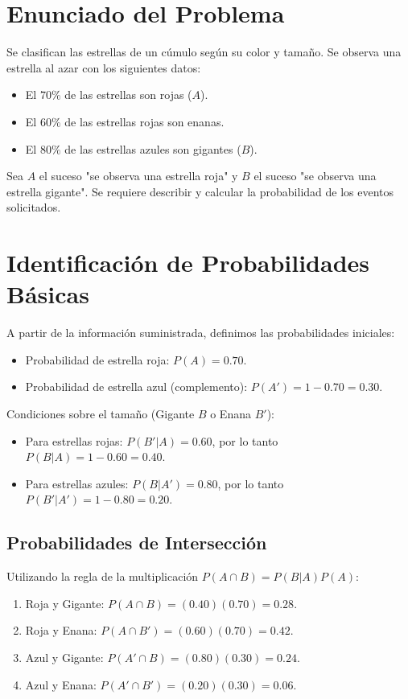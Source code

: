 \documentclass[12pt]{article}
\begin{document}
\section{Enunciado del Problema}
Se clasifican las estrellas de un cúmulo según su color y tamaño. Se observa una estrella al azar con los siguientes datos:
\begin{itemize}
    \item El $70\%$ de las estrellas son rojas ($A$).
    \item El $60\%$ de las estrellas rojas son enanas.
    \item El $80\%$ de las estrellas azules son gigantes ($B$).
\end{itemize}

Sea $A$ el suceso "se observa una estrella roja" y $B$ el suceso "se observa una estrella gigante". Se requiere describir y calcular la probabilidad de los eventos solicitados.

\section{Identificación de Probabilidades Básicas}
A partir de la información suministrada, definimos las probabilidades iniciales:
\begin{itemize}
    \item Probabilidad de estrella roja: $P(A) = 0.70$.
    \item Probabilidad de estrella azul (complemento): $P(A') = 1 - 0.70 = 0.30$.
\end{itemize}

Condiciones sobre el tamaño (Gigante $B$ o Enana $B'$):
\begin{itemize}
    \item Para estrellas rojas: $P(B'|A) = 0.60$, por lo tanto $P(B|A) = 1 - 0.60 = 0.40$.
    \item Para estrellas azules: $P(B|A') = 0.80$, por lo tanto $P(B'|A') = 1 - 0.80 = 0.20$.
\end{itemize}

\subsection{Probabilidades de Intersección}
Utilizando la regla de la multiplicación $P(A \cap B) = P(B|A)P(A)$:
\begin{enumerate}
    \item Roja y Gigante: $P(A \cap B) = (0.40)(0.70) = 0.28$.
    \item Roja y Enana: $P(A \cap B') = (0.60)(0.70) = 0.42$.
    \item Azul y Gigante: $P(A' \cap B) = (0.80)(0.30) = 0.24$.
    \item Azul y Enana: $P(A' \cap B') = (0.20)(0.30) = 0.06$.
\end{enumerate}
\end{document}
